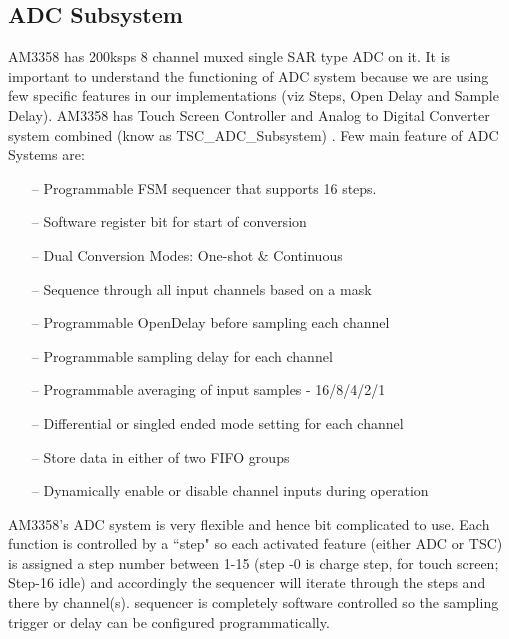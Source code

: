 \subsection{ADC Subsystem}
AM3358 has 200ksps 8 channel muxed single SAR type ADC on it. It is important to understand the functioning of ADC system because we are using few specific features in our implementations (viz Steps, Open Delay and Sample Delay). AM3358 has Touch Screen Controller and Analog to Digital Converter system combined (know as TSC\_ADC\_Subsystem) \cite{AM3358TRM} . Few main feature of ADC Systems are: 
\begin{itemize}
	\item[--] Programmable FSM sequencer that supports 16 steps.
	\item[--] Software register bit for start of conversion
	\item[--] Dual Conversion Modes: One-shot \& Continuous
	\item[--] Sequence through all input channels based on a mask
	\item[--] Programmable OpenDelay before sampling each channel
	\item[--] Programmable sampling delay for each channel
	\item[--] Programmable averaging of input samples - 16/8/4/2/1
	\item[--] Differential or singled ended mode setting for each channel
	\item[--] Store data in either of two FIFO groups
	\item[--] Dynamically enable or disable channel inputs during operation
\end{itemize}
AM3358's ADC system is very flexible and hence bit complicated to use. Each function is controlled by a ``step" so each activated feature (either ADC or TSC) is assigned a step number between 1-15 (step -0 is charge step, for touch screen; Step-16 idle) and accordingly the sequencer will iterate through the steps and there by channel(s). sequencer is completely software controlled so the sampling trigger or delay can be configured programmatically.
